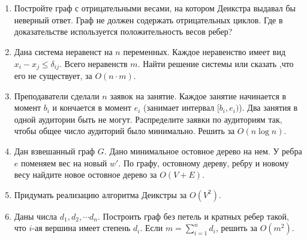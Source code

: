 \section{}

\begin{enumerate}

  \item Постройте граф с отрицательными весами,
  на котором Деикстра выдавал бы неверный ответ.
  Граф не должен содержать отрицательных циклов.
  Где в доказательстве используется положительность
  весов ребер?

  \item Дана система неравенст на $n$ переменных.
  Каждое неравенство имеет вид $x_i - x_j \leq \delta_{ij}$.
  Всего неравенств $m$. Найти решение системы или сказать
  ,что его не существует, за $O(n \cdot m)$.

  \item Преподаватели сделали $n$ заявок на занятие. Каждое
  занятие начинается в момент $b_i$ и кончается в момент $e_i$
  (занимает интервал $[b_i, e_i)$). Два занятия в одной аудитории
  быть не могут. Распределите заявки по аудиториям так, чтобы
  общее число аудиторий было минимально. Решить за $O(n \log n)$.
  
  \item Дан взвешанный граф $G$. Дано минимальное остовное дерево
  на нем. У ребра $e$ поменяем вес на новый $w'$. По графу, остовному
  дереву, ребру и новому весу найдите новое остовное дерево за $O(V + E)$.

  \item Придумать реализацию алгоритма Деикстры за $O(V^2)$.

  \item Даны числа $d_1, d_2, \cdots d_n$. Построить граф без петель 
  и кратных ребер такой, что $i$-ая вершина имеет степень $d_i$.
  Если $m = \sum_{i = 1}^n d_i$, решить за $O(m^2)$.


\end{enumerate}



